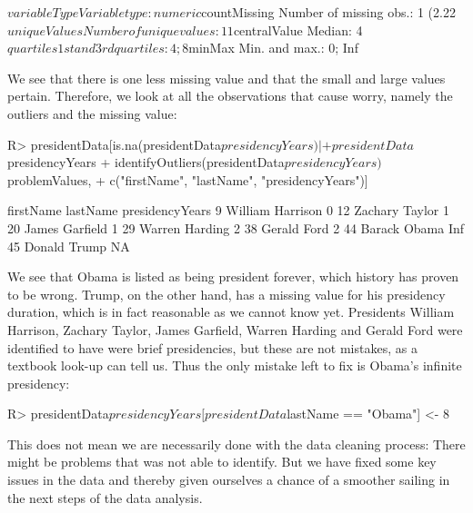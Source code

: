 \documentclass[article,shortnames]{jss}
\begin{document}
\begin{Schunk}
\begin{Soutput}
$variableType
Variable type: numeric
$countMissing
Number of missing obs.: 1 (2.22 %
$uniqueValues
Number of unique values: 11
$centralValue
Median: 4
$quartiles
1st and 3rd quartiles: 4; 8
$minMax
Min. and max.: 0; Inf
\end{Soutput}
\end{Schunk} %
We see that there is one less missing value and that the small and large values pertain. Therefore, we look at all the observations that cause worry, namely the outliers and the missing value:
\begin{Schunk}
\begin{Sinput}
R> presidentData[is.na(presidentData$presidencyYears) | 
+     presidentData$presidencyYears %
+     identifyOutliers(presidentData$presidencyYears)$problemValues, 
+     c("firstName", "lastName", "presidencyYears")]
\end{Sinput}
\begin{Soutput}
   firstName lastName presidencyYears
9    William Harrison               0
12   Zachary   Taylor               1
20     James Garfield               1
29    Warren  Harding               2
38    Gerald     Ford               2
44    Barack    Obama             Inf
45    Donald    Trump              NA
\end{Soutput}
\end{Schunk}
We see that Obama is listed as being president forever, which history has proven to be wrong. Trump, on the other hand, has a missing value for his presidency duration, which is in fact reasonable as we cannot know yet. Presidents William Harrison, Zachary Taylor, James Garfield, Warren Harding and Gerald Ford were identified to have were brief presidencies, but these are not mistakes, as a textbook look-up can tell us. Thus the only mistake left to fix is Obama's infinite presidency:
\begin{Schunk}
\begin{Sinput}
R> presidentData$presidencyYears[presidentData$lastName == "Obama"] <- 8
\end{Sinput}
\end{Schunk}
This does not mean we are necessarily done with the data cleaning process: There might be problems that  was not able to identify. But we have fixed some key issues in the data and thereby given ourselves a chance of a smoother sailing in the next steps of the data analysis. 
\end{document}
